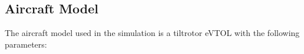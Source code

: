 \documentclass[journal,article,submit,pdftex,moreauthors]{Definitions/mdpi}
\begin{document}
\subsection{Aircraft Model}
The aircraft model used in the simulation is a tiltrotor eVTOL with the following parameters:
    
    
\end{document}
